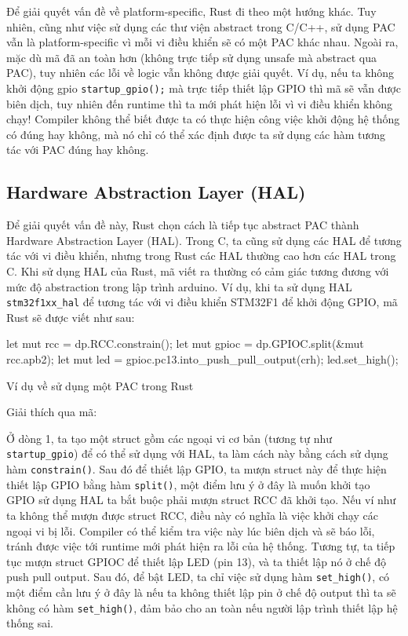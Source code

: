 Để giải quyết vấn đề về platform-specific, Rust đi theo một hướng khác.
Tuy nhiên, cũng như việc sử dụng các thư viện abstract trong C/C++, sử dụng PAC vẫn là platform-specific vì mỗi vi điều khiển sẽ có một PAC khác nhau.
Ngoài ra, mặc dù mã đã an toàn hơn (không trực tiếp sử dụng unsafe mà abstract qua PAC), tuy nhiên các lỗi về logic vẫn không được giải quyết.
Ví dụ, nếu ta không khởi động gpio \texttt{startup_gpio();} mà trực tiếp thiết lập GPIO thì mã sẽ vẫn được biên dịch, tuy nhiên đến runtime thì ta mới phát hiện lỗi vì vi điều khiển không chạy!
Compiler không thể biết được ta có thực hiện công việc khởi động hệ thống có đúng hay không, mà nó chỉ có thể xác định được ta sử dụng các hàm tương tác với PAC đúng hay không.

\subsection{Hardware Abstraction Layer (HAL)}
Để giải quyết vấn đề này, Rust chọn cách là tiếp tục abstract PAC thành Hardware Abstraction Layer (HAL).
Trong C, ta cũng sử dụng các HAL để tương tác với vi điều khiển, nhưng trong Rust các HAL thường cao hơn các HAL trong C.
Khi sử dụng HAL của Rust, mã viết ra thường có cảm giác tương đương với mức độ abstraction trong lập trình arduino.
Ví dụ, khi ta sử dụng HAL \texttt{stm32f1xx_hal} để tương tác với vi điều khiển STM32F1 để khởi động GPIO, mã Rust sẽ được viết như sau:
\begin{listing}[ht]
\begin{rustcode}
let mut rcc = dp.RCC.constrain();
let mut gpioc = dp.GPIOC.split(&mut rcc.apb2);
let mut led = gpioc.pc13.into_push_pull_output(crh);
led.set_high();
\end{rustcode}
\caption{Ví dụ về sử dụng một PAC trong Rust}
\end{listing}

Giải thích qua mã:

Ở dòng 1, ta tạo một struct gồm các ngoại vi cơ bản (tương tự như \texttt{startup_gpio}) để có thể sử dụng với HAL, ta làm cách này bằng cách sử dụng hàm \texttt{constrain()}.
Sau đó để thiết lập GPIO, ta mượn struct này để thực hiện thiết lập GPIO bằng hàm \texttt{split()}, một điểm lưu ý ở đây là muốn khởi tạo GPIO sử dụng HAL ta bắt buộc phải mượn struct RCC đã khởi tạo.
Nếu ví như ta không thể mượn được struct RCC, điều này có nghĩa là việc khởi chạy các ngoại vi bị lỗi.
Compiler có thể kiểm tra việc này lúc biên dịch và sẽ báo lỗi, tránh được việc tới runtime mới phát hiện ra lỗi của hệ thống.
Tương tự, ta tiếp tục mượn struct GPIOC để thiết lập LED (pin 13), và ta thiết lập nó ở chế độ push pull output.
Sau đó, để bật LED, ta chỉ việc sử dụng hàm \texttt{set_high()}, có một điểm cần lưu ý ở đây là nếu ta không thiết lập pin ở chế độ output thì ta sẽ không có hàm \texttt{set_high()}, đảm bảo cho an toàn nếu người lập trình thiết lập hệ thống sai.

